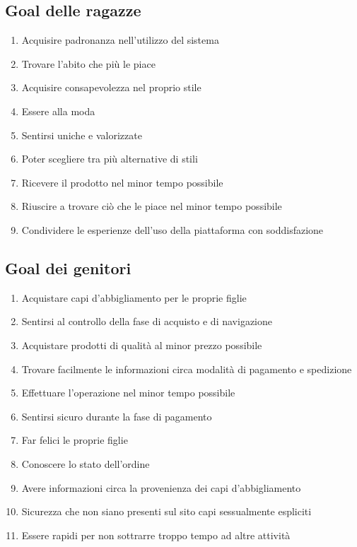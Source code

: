 \documentclass[12pt,a4paper]{report}
\begin{document}
\subsection*{Goal delle ragazze}
\begin{enumerate}
  \item Acquisire padronanza nell'utilizzo del sistema
  \item Trovare l'abito che più le piace
  \item Acquisire consapevolezza nel proprio stile
  \item Essere alla moda
  \item Sentirsi uniche e valorizzate
  \item Poter scegliere tra più alternative di stili
  \item Ricevere il prodotto nel minor tempo possibile
  \item Riuscire a trovare ciò che le piace nel minor tempo possibile
  \item Condividere le esperienze dell'uso della piattaforma con soddisfazione
\end{enumerate}
\subsection*{Goal dei genitori}
\begin{enumerate}
  \item Acquistare capi d'abbigliamento per le proprie figlie
  \item Sentirsi al controllo della fase di acquisto e di navigazione
  \item Acquistare prodotti di qualità al minor prezzo possibile
  \item Trovare facilmente le informazioni circa modalità di pagamento e spedizione
  \item Effettuare l'operazione nel minor tempo possibile
  \item Sentirsi sicuro durante la fase di pagamento
  \item Far felici le proprie figlie
  \item Conoscere lo stato dell'ordine
  \item Avere informazioni circa la provenienza dei capi d'abbigliamento
  \item Sicurezza che non siano presenti sul sito capi sessualmente espliciti
  \item Essere rapidi per non sottrarre troppo tempo ad altre attività
\end{enumerate}
\end{document}
